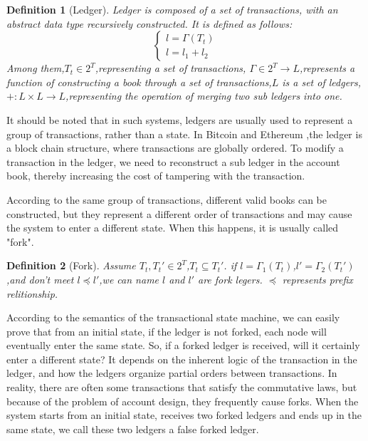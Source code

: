 \documentclass[UTF8,nofonts]{article}
\newtheorem{definition}{Definition}[section]
\begin{document}
\begin{multicols}{2}
\begin{definition}[Ledger] \label{def:ledger}
Ledger is composed of a set of transactions, with an abstract data type recursively constructed. It is defined as follows:
$$
\left\{\begin{matrix}
l = \Gamma(T_{t})\\ 
l = l_{1} + l_{2}
\end{matrix}\right.
$$
Among them,$T_{t} \in 2^{T}$,representing a set of transactions, $\Gamma \in 2^{T} \rightarrow L$,represents a function of constructing a book through a set of transactions,$L$  is a set of ledgers,$\boldsymbol{+}: L \times L \rightarrow L$,representing the operation of merging two sub ledgers into one.
\end{definition}

It should be noted that in such systems, ledgers are usually used to represent a group of transactions, rather than a state. In Bitcoin \cite{nakamoto2008bitcoin}and Ethereum \cite{wood2014ethereum},the ledger is a block chain structure, where transactions are globally ordered. To modify a transaction in the ledger, we need to reconstruct a sub ledger in the account book, thereby increasing the cost of tampering with the transaction.

According to the same group of transactions, different valid books can be constructed, but they represent a different order of transactions and may cause the system to enter a different state. When this happens, it is usually called "fork".
\begin{definition}[Fork] \label{def:fork}
Assume $T_{t},{T_{t}}' \in 2^{T}$,$T_{t} \subseteq {T_{t}}'$. if $l=\Gamma_{1}(T_{t})$,${l}'= \Gamma_{2}({T_{t}}')$,and don't meet $l \preceq {l}'$,we can name $l$ and ${l}'$ are fork legers. $\preceq$ represents prefix relitionship.
\end{definition}

According to the semantics of the transactional state machine, we can easily prove that from an initial state, if the ledger is not forked, each node will eventually enter the same state. So, if a forked ledger is received, will it certainly enter a different state? It depends on the inherent logic of the transaction in the ledger, and how the ledgers organize partial orders between transactions. In reality, there are often some transactions that satisfy the commutative laws, but because of the problem of account design, they frequently cause forks. When the system starts from an initial state, receives two forked ledgers and ends up in the same state, we call these two ledgers a false forked ledger.


\end{multicols}
\end{document}
